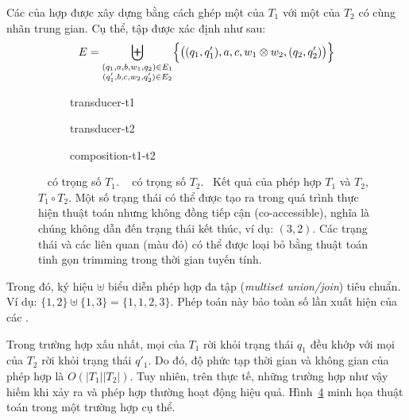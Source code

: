 Các  của  hợp được xây dựng bằng cách ghép
một  của $T_1$ với một  của $T_2$
có cùng nhãn trung gian. Cụ thể, tập  được xác định như sau:
\begin{equation}
E=
\biguplus_
{\substack{
(q_1,a,b,w_1,q_2)\in E_1 \\
(q'_1,b,c,w_2,q'_2)\in E_2
}}
\Bigl\{
\bigl(
(q_1,q'_1),
a,
c,
w_1 \otimes w_2,
(q_2,q'_2)
\bigr)
\Bigr\}
\end{equation}

\begin{figure}[htbp]
  \centering

  \begin{subfigure}{0.48\textwidth}
    \centering
    {transducer-t1}
    \caption{}
    \label{fig:transducer-t1}
  \end{subfigure}
  \hfill
  \begin{subfigure}{0.48\textwidth}
    \centering
    {transducer-t2}
    \caption{}
    \label{fig:transducer-t2}
  \end{subfigure}

  \vspace{0.8cm}

  \begin{subfigure}{\textwidth}
    \centering
    {composition-t1-t2}
    \caption{}
    \label{fig:composition-t1-t2}
  \end{subfigure}

  \caption[Hợp các \protect{} có trọng số]{
    ~ có trọng số $T_1$. 
    ~ có trọng số $T_2$. 
    ~Kết quả của phép hợp $T_1$ và $T_2$, $T_1 \circ T_2$. 
    Một số trạng thái có thể được tạo ra trong quá trình thực hiện thuật toán nhưng không đồng tiếp cận (co-accessible), nghĩa là chúng không dẫn đến trạng thái kết thúc, ví dụ: $(3,2)$. 
    Các trạng thái và các  liên quan (màu đỏ) có thể được loại bỏ bằng thuật toán tinh gọn trimming trong thời gian tuyến tính.
  }
  \label{fig:full-composition-trimming}
\end{figure}

Trong đó, ký hiệu $\uplus$ biểu diễn phép hợp đa tập
(\textit{multiset union/join}) tiêu chuẩn.
Ví dụ:
$\{1,2\} \uplus \{1,3\} = \{1,1,2,3\}$.
Phép toán này bảo toàn số lần xuất hiện
của các .

Trong trường hợp xấu nhất,
mọi  của $T_1$
rời khỏi trạng thái $q_1$
đều khớp với mọi  của $T_2$
rời khỏi trạng thái $q'_1$.
Do đó,
độ phức tạp thời gian và không gian
của phép hợp là
$O(|T_1||T_2|)$.
Tuy nhiên,
trên thực tế,
những trường hợp như vậy hiếm khi xảy ra
và phép hợp thường hoạt động hiệu quả.
Hình~\ref{fig:full-composition-trimming}
minh họa thuật toán
trong một trường hợp cụ thể.

